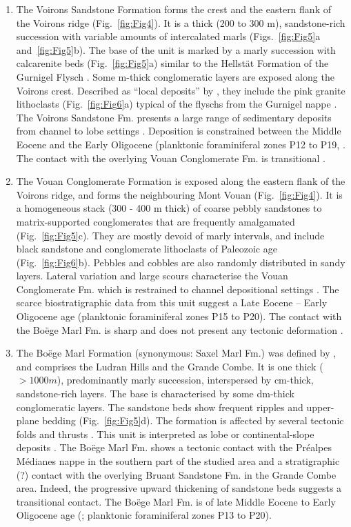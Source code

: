 \documentclass[twoside]{article}
\begin{document}
\begin{enumerate}
 \item The Voirons Sandstone Formation forms the crest and the eastern flank of the Voirons ridge (Fig.~\ref{fig:Fig4}). It is a thick (200 to 300 m), sandstone-rich succession with variable amounts of intercalated marls (Figs.~\ref{fig:Fig5}a and~\ref{fig:Fig5}b). The base of the unit is marked by a marly succession with calcarenite beds (Fig.~\ref{fig:Fig5}a) similar to the Hellstät Formation of the Gurnigel Flysch \citep{Tercier1928a,Caron1980,Caron1989}. Some m-thick conglomeratic layers are exposed along the Voirons crest. Described as “local deposits” by \cite{Lombard1940a}, they include the pink granite lithoclasts (Fig.~\ref{fig:Fig6}a) typical of the flyschs from the Gurnigel nappe \citep{Caron1976}. The Voirons Sandstone Fm. presents a large range of sedimentary deposits from channel to lobe settings \citep{Ragusa2015}. Deposition is constrained between the Middle Eocene and the Early Oligocene (planktonic foraminiferal zones P12 to P19, \citealp{Ospina-Ostios2013}. The contact with the overlying Vouan Conglomerate Fm. is transitional \citep{Ragusa2015}.
 \item The Vouan Conglomerate Formation is exposed along the eastern flank of the Voirons ridge, and forms the neighbouring Mont Vouan (Fig.~\ref{fig:Fig4}). It is a homogeneous stack (300 - 400 m thick) of coarse pebbly sandstones to matrix-supported conglomerates that are frequently amalgamated (Fig.~\ref{fig:Fig5}c). They are mostly devoid of marly intervals, and include black sandstone and conglomerate lithoclasts of Paleozoic age (Fig.~\ref{fig:Fig6}b). Pebbles and cobbles are also randomly distributed in sandy layers. Lateral variation and large scours \citep{Frebourg2006} characterise the Vouan Conglomerate Fm. which is restrained to channel depositional settings \citep{Ragusa2015}. The scarce biostratigraphic data from this unit \citep{Frebourg2006,Ospina-Ostios2013} suggest a Late Eocene – Early Oligocene age (planktonic foraminiferal zones P15 to P20). The contact with the Boëge Marl Fm. is sharp and does not present any tectonic deformation \citep{Ragusa2015}.
 \item The Boëge Marl Formation (synonymous: Saxel Marl Fm.) was defined by \cite{Stuijvenberg1980b}, and comprises the Ludran Hills and the Grande Combe. It is one thick ($>1000 m$), predominantly marly succession, interspersed by cm-thick, sandstone-rich layers. The base is characterised by some dm-thick conglomeratic layers. The sandstone beds show frequent ripples and upper-plane bedding (Fig.~\ref{fig:Fig5}d). The formation is affected by several tectonic folds and thrusts \citep{Coppo1999,Ragusa2015}. This unit is interpreted as lobe or continental-slope deposits \citep{Winkler1984}. The Boëge Marl Fm. shows a tectonic contact with the Préalpes Médianes nappe in the southern part of the studied area and a stratigraphic (?) contact with the overlying Bruant Sandstone Fm. in the Grande Combe area. Indeed, the progressive upward thickening of sandstone beds suggests a transitional contact. The Boëge Marl Fm. is of late Middle Eocene to Early Oligocene age (\citealp{Ospina-Ostios2013}; planktonic foraminiferal zones P13 to P20).

\end{enumerate}
\end{document}
